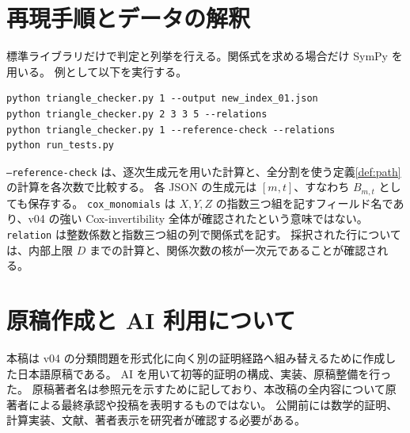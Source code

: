 \documentclass[11pt,a4paper]{ltjsarticle}
\numberwithin{equation}{section}
\theoremstyle{definition}
\begin{document}
\section{再現手順とデータの解釈}\label{app:run}
標準ライブラリだけで判定と列挙を行える。関係式を求める場合だけ SymPy を用いる。
例として以下を実行する。
\begin{verbatim}
python triangle_checker.py 1 --output new_index_01.json
python triangle_checker.py 2 3 3 5 --relations
python triangle_checker.py 1 --reference-check --relations
python run_tests.py
\end{verbatim}
\texttt{--reference-check} は、逐次生成元を用いた計算と、全分割を使う定義\ref{def:path}の計算を各次数で比較する。
各 JSON の生成元は $[m,t]$、すなわち $B_{m,t}$ としても保存する。
\texttt{cox\_monomials} は $X,Y,Z$ の指数三つ組を記すフィールド名であり、v04 の強い Cox-invertibility 全体が確認されたという意味ではない。
\texttt{relation} は整数係数と指数三つ組の列で関係式を記す。
採択された行については、内部上限 $D$ までの計算と、関係次数の核が一次元であることが確認される。

\section*{原稿作成と AI 利用について}
本稿は v04 の分類問題を形式化に向く別の証明経路へ組み替えるために作成した日本語原稿である。
AI を用いて初等的証明の構成、実装、原稿整備を行った。
原稿著者名は参照元を示すために記しており、本改稿の全内容について原著者による最終承認や投稿を表明するものではない。
公開前には数学的証明、計算実装、文献、著者表示を研究者が確認する必要がある。
\end{document}
